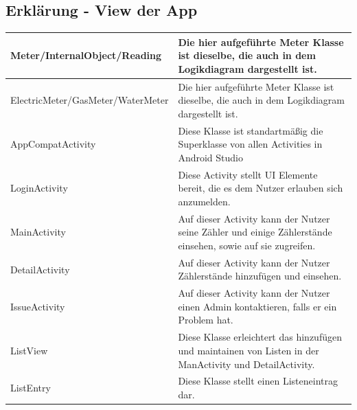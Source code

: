 \subsection*{Erklärung - View der App}
\begin{tabularx}{15cm}{XX}
	\hline
	Meter/InternalObject/Reading & Die hier aufgeführte Meter Klasse ist dieselbe, die auch in dem Logikdiagram dargestellt ist. \\ \hline
	ElectricMeter/GasMeter/WaterMeter & Die hier aufgeführte Meter Klasse ist dieselbe, die auch in dem Logikdiagram dargestellt ist. \\ \hline
	AppCompatActivity & Diese Klasse ist standartmäßig die Superklasse von allen Activities in Android Studio \\ \hline
	LoginActivity & Diese Activity stellt UI Elemente bereit, die es dem Nutzer erlauben sich anzumelden. \\ \hline
	MainActivity & Auf dieser Activity kann der Nutzer seine Zähler und einige Zählerstände einsehen, sowie auf sie zugreifen. \\ \hline
	DetailActivity & Auf dieser Activity kann der Nutzer Zählerstände hinzufügen und einsehen. \\ \hline
	IssueActivity & Auf dieser Activity kann der Nutzer einen Admin kontaktieren, falls er ein Problem hat. \\ \hline
	ListView & Diese Klasse erleichtert das hinzufügen und maintainen von Listen in der ManActivity und DetailActivity. \\ \hline
	ListEntry & Diese Klasse stellt einen Listeneintrag dar. 
\end{tabularx}

